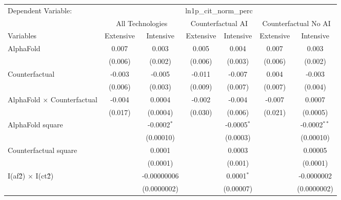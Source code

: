 \begingroup
\centering
\begin{tabular}{lcccccc}
   \tabularnewline \midrule \midrule
   Dependent Variable: & \multicolumn{6}{c}{ln1p\_cit\_norm\_perc}\\
 & \multicolumn{2}{c}{All Technologies} & \multicolumn{2}{c}{Counterfactual AI} & \multicolumn{2}{c}{Counterfactual No AI} \\
\cmidrule(lr){1-1}\cmidrule(lr){2-3} \cmidrule(lr){4-5} \cmidrule(lr){6-7}
Variables & \multicolumn{1}{c}{Extensive} & \multicolumn{1}{c}{Intensive} & \multicolumn{1}{c}{Extensive} & \multicolumn{1}{c}{Intensive} & \multicolumn{1}{c}{Extensive} & \multicolumn{1}{c}{Intensive} \\
\cmidrule(lr){1-1}\cmidrule(lr){2-2} \cmidrule(lr){3-3} \cmidrule(lr){4-4} \cmidrule(lr){5-5} \cmidrule(lr){6-6} \cmidrule(lr){7-7}
   AlphaFold                          & 0.007   & 0.003         & 0.005   & 0.004         & 0.007   & 0.003\\   
                                      & (0.006) & (0.002)       & (0.006) & (0.003)       & (0.006) & (0.002)\\   
   Counterfactual                     & -0.003  & -0.005        & -0.011  & -0.007        & 0.004   & -0.003\\   
                                      & (0.006) & (0.003)       & (0.009) & (0.007)       & (0.007) & (0.004)\\   
   AlphaFold $\times$ Counterfactual  & -0.004  & 0.0004        & -0.002  & -0.004        & -0.007  & 0.0007\\   
                                      & (0.017) & (0.0004)      & (0.030) & (0.006)       & (0.021) & (0.0005)\\   
   AlphaFold square                   &         & -0.0002$^{*}$ &         & -0.0005$^{*}$ &         & -0.0002$^{**}$\\   
                                      &         & (0.00010)     &         & (0.0003)      &         & (0.00010)\\   
   Counterfactual square              &         & 0.0001        &         & 0.0003        &         & 0.00005\\   
                                      &         & (0.0001)      &         & (0.001)       &         & (0.0001)\\   
   I(af\^2) $\times$ I(ct\^2)         &         & -0.00000006   &         & 0.0001$^{*}$  &         & -0.0000002\\   
                                      &         & (0.0000002)   &         & (0.00007)     &         & (0.0000002)\\   

\end{tabular}
